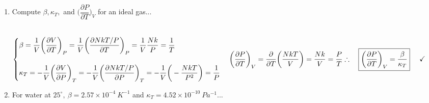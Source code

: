\documentclass[fleqn]{article}
\begin{document}
\begin{enumerate}
\begin{enumerate}
      \item Compute $\beta, \kappa_T,$ and $\bigg( \dfrac{\partial P}{\partial T} \bigg)_V$ for an ideal gas...

        \textcolor{hwColor}{
          \\
          $
            \begin{cases}
              \beta=\dfrac{1}{V} \bigg( \dfrac{\partial V}{\partial T} \bigg)_P
              =\dfrac{1}{V} \bigg( \dfrac{\partial N k T/P}{\partial T} \bigg)_P
              =\dfrac{1}{V} \dfrac{N k}{P}
              =\dfrac{1}{T}
              \\
              \\
              \kappa_T=-\dfrac{1}{V} \bigg( \dfrac{\partial V}{\partial P} \bigg)_T
              =-\dfrac{1}{V} \bigg( \dfrac{\partial NkT/P}{\partial P} \bigg)_T
              =-\dfrac{1}{V} \bigg( -\dfrac{NkT}{P^2} \bigg)=\dfrac{1}{P}
            \end{cases}
            \\
            \\
            \\
            \bigg( \dfrac{\partial P}{\partial T} \bigg)_V=\dfrac{\partial}{\partial T} \bigg( \dfrac{NkT}{V} \bigg)=\dfrac{Nk}{V}=\dfrac{P}{T}
            \\
            \\
            \\
            \therefore ~~~ \boxed{
              \bigg( \dfrac{\partial P}{\partial T} \bigg)_V=\dfrac{\beta}{\kappa_T}
            } ~~~~ \checkmark
            \\
            \\
          $
        }

      \item For water at $25^{\circ}, ~ \beta=2.57 \times 10^{-4} ~ K^{-1}$ and $\kappa_T=4.52 \times 10^{-10} ~ Pa^{-1}$...


\end{enumerate}
\end{enumerate}
\end{document}
